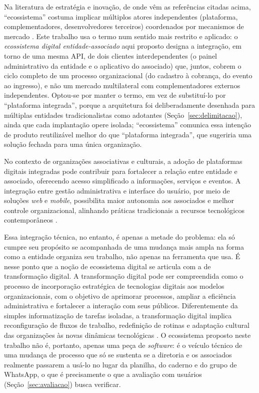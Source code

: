 \documentclass[12pt,a4paper]{article}
\begin{document}
Na literatura de estratégia e inovação, de onde vêm as referências citadas acima, ``ecossistema''
costuma implicar múltiplos atores independentes (plataforma, complementadores, desenvolvedores
terceiros) coordenados por mecanismos de mercado \parencite{gawercusumano2014,jacobides2018}. Este
trabalho usa o termo num sentido mais restrito e aplicado: o \textit{ecossistema digital
entidade-associado} aqui proposto designa a integração, em torno de uma mesma API, de dois clientes
interdependentes (o painel administrativo da entidade e o aplicativo do associado) que, juntos,
cobrem o ciclo completo de um processo organizacional (do cadastro à cobrança, do evento ao
ingresso), e não um mercado multilateral com complementadores externos independentes. Optou-se por
manter o termo, em vez de substituí-lo por ``plataforma integrada'', porque a arquitetura foi
deliberadamente desenhada para múltiplas entidades tradicionalistas como adotantes
(Seção~\ref{sec:delimitacao}), ainda que cada implantação opere isolada; ``ecossistema'' comunica
essa intenção de produto reutilizável melhor do que ``plataforma integrada'', que sugeriria uma
solução fechada para uma única organização.

No contexto de organizações associativas e culturais, a adoção de plataformas digitais integradas
pode contribuir para fortalecer a relação entre entidade e associado, oferecendo acesso simplificado
a informações, serviços e eventos. A integração entre gestão administrativa e interface do usuário,
por meio de soluções \textit{web} e \textit{mobile}, possibilita maior autonomia aos associados e
melhor controle organizacional, alinhando práticas tradicionais a recursos tecnológicos
contemporâneos \parencite{jacobides2018,verhoef2021}.

Essa integração técnica, no entanto, é apenas a metade do problema: ela só cumpre seu propósito se
acompanhada de uma mudança mais ampla na forma como a entidade organiza seu trabalho, não apenas na
ferramenta que usa. É nesse ponto que a noção de ecossistema digital se articula com a de
transformação digital. A transformação digital pode ser compreendida como o processo de incorporação
estratégica de tecnologias digitais aos modelos organizacionais, com o objetivo de aprimorar
processos, ampliar a eficiência administrativa e fortalecer a interação com seus públicos.
Diferentemente da simples informatização de tarefas isoladas, a transformação digital implica
reconfiguração de fluxos de trabalho, redefinição de rotinas e adaptação cultural das organizações às
novas dinâmicas tecnológicas \parencite{vial2019}. O ecossistema proposto neste trabalho não é,
portanto, apenas uma peça de \textit{software}: é o veículo técnico de uma mudança de processo que só
se sustenta se a diretoria e os associados realmente passarem a usá-lo no lugar da planilha, do
caderno e do grupo de WhatsApp, o que é precisamente o que a avaliação com usuários
(Seção~\ref{sec:avaliacao}) busca verificar.
\end{document}
